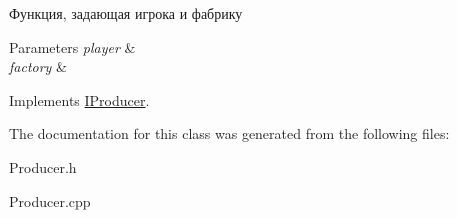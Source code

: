 Функция, задающая игрока и фабрику 


\begin{DoxyParams}{Parameters}
{\em player} & \\
\hline
{\em factory} & \\
\hline
\end{DoxyParams}


Implements \hyperlink{classIProducer}{I\+Producer}.



The documentation for this class was generated from the following files\+:\begin{DoxyCompactItemize}
\item 
Producer.\+h\item 
Producer.\+cpp\end{DoxyCompactItemize}
